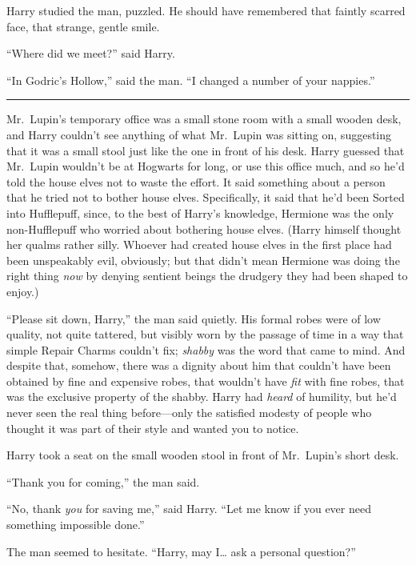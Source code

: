 Harry studied the man, puzzled. He should have remembered that faintly
scarred face, that strange, gentle smile.

``Where did we meet?'' said Harry.

``In Godric's Hollow,'' said the man. ``I changed a number of your
nappies.''

\begin{center}\rule{3in}{0.4pt}\end{center}

Mr.~Lupin's temporary office was a small stone room with a small wooden
desk, and Harry couldn't see anything of what Mr.~Lupin was sitting on,
suggesting that it was a small stool just like the one in front of his
desk. Harry guessed that Mr.~Lupin wouldn't be at Hogwarts for long, or
use this office much, and so he'd told the house elves not to waste the
effort. It said something about a person that he tried not to bother
house elves. Specifically, it said that he'd been Sorted into
Hufflepuff, since, to the best of Harry's knowledge, Hermione was the
only non-Hufflepuff who worried about bothering house elves. (Harry
himself thought her qualms rather silly. Whoever had created house elves
in the first place had been unspeakably evil, obviously; but that didn't
mean Hermione was doing the right thing \emph{now} by denying sentient
beings the drudgery they had been shaped to enjoy.)

``Please sit down, Harry,'' the man said quietly. His formal robes were
of low quality, not quite tattered, but visibly worn by the passage of
time in a way that simple Repair Charms couldn't fix; \emph{shabby} was
the word that came to mind. And despite that, somehow, there was a
dignity about him that couldn't have been obtained by fine and expensive
robes, that wouldn't have \emph{fit} with fine robes, that was the
exclusive property of the shabby. Harry had \emph{heard} of humility,
but he'd never seen the real thing before---only the satisfied modesty
of people who thought it was part of their style and wanted you to
notice.

Harry took a seat on the small wooden stool in front of Mr.~Lupin's
short desk.

``Thank you for coming,'' the man said.

``No, thank \emph{you} for saving me,'' said Harry. ``Let me know if you
ever need something impossible done.''

The man seemed to hesitate. ``Harry, may I\ldots{} ask a personal
question?''

